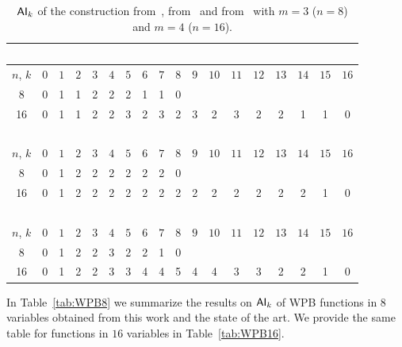 \documentclass[11pt]{llncs}
\begin{document}
\begin{table}[h]
\center
\caption{$\mathsf{AI}_{k}$ of the construction from~\cite{AMC:DalMal23}, from~\cite{Mat:ZJZQ23} and from~\cite{CC:TangLiu19} with $m=3$ ($n=8$) and $m=4$ ($n=16$).\label{table:publiedFunctions}}
\begin{tabular}{|c|c|c|c|c|c|c|c|c|c|c|c|c|c|c|c|c|c|}
\hline
\multicolumn{18}{|c|}{~\cite{AMC:DalMal23}} \\
\hline
$n$, $k$ & $0$ & $1$ & $2$ & $3$ & $4$ & $5$ & $6$ & $7$ & $8$ & $9$ & $10$ & $11$ & $12$ & $13$ & $14$ & $15$ & $16$ \\
\hline
8 & 0 & 1 & 1 & 2 & 2 & 2 & 1 & 1 & 0 &  &  &  &  &  &  &  &  \\
16 & 0 & 1 & 1 & 2 & 2 & 3 & 2 & 3 & 2 &  3 & 2 & 3 & 2 & 2 & 1 & 1 & 0 \\
\hline
\hline
\multicolumn{18}{|c|}{~\cite{Mat:ZJZQ23}} \\
\hline
$n$, $k$ & $0$ & $1$ & $2$ & $3$ & $4$ & $5$ & $6$ & $7$ & $8$ & $9$ & $10$ & $11$ & $12$ & $13$ & $14$ & $15$ & $16$ \\
\hline
8 & 0 & 1 & 2 & 2 & 2 & 2 & 2 & 2 & 0 &  &  &  &  &  &  &  &  \\
16 & 0 & 1 & 2 & 2 & 2 & 2 & 2 & 2 & 2 & 2  & 2 & 2 & 2 & 2 & 2 & 1 & 0 \\
\hline
\multicolumn{18}{|c|}{~\cite{CC:TangLiu19}} \\
\hline
$n$, $k$ & $0$ & $1$ & $2$ & $3$ & $4$ & $5$ & $6$ & $7$ & $8$ & $9$ & $10$ & $11$ & $12$ & $13$ & $14$ & $15$ & $16$ \\
\hline
8 & 0 & 1 & 2 & 2 & 3 & 2 & 2 & 1 & 0 &  &  &  &  &  &  &  &  \\
16 & 0 & 1 & 2 & 2 & 3 & 3 & 4 & 4 & 5 & 4  & 4 & 3 & 3 & 2 & 2 & 1 & 0 \\
\hline
\end{tabular}

\end{table}


In Table~\ref{tab:WPB8} we summarize the results on $\mathsf{AI}_{k}$ of WPB functions in $8$ variables obtained from this work and the state of the art. 
We provide the same table for functions in $16$ variables in Table~\ref{tab:WPB16}.
\end{document}
